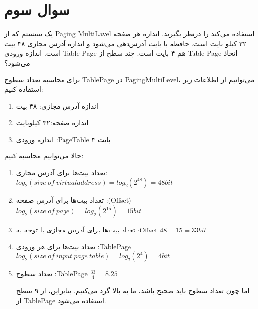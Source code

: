 \section{سوال سوم}
یک سیستم که از Paging MultiLavel استفاده می‌کند را درنظر بگیرید. اندازه هر صفحه ۳۲ کبلو بایت است. حافظه با بایت آدرس‌دهی می‌شود و اندازه آدرس مجازی ۴۸ بیت است. اندازه ورودی Table Page هم ۴ بایت است. چند سطح از Table Page اتخاذ می‌شود؟ 

\begin{qsolve}
	
	برای محاسبه تعداد سطوح TablePage در PagingMultiLevel، می‌توانیم از اطلاعات زیر استفاده کنیم:
	
	\begin{enumerate}
		\item اندازه آدرس مجازی: ۴۸ بیت
		\item اندازه صفحه:‌۳۲ کیلوبایت
		\item اندازه ورودی :PageTable ۴ بایت
	\end{enumerate}
	
	حالا می‌توانیم محاسبه کنیم:
	
	\begin{enumerate}
		\item تعداد بیت‌ها برای آدرس مجازی:
		$log_2(size \ of \ virtual address) = log_2(2^{48}) = 48 bit$
		
		\item تعداد بیت‌ها برای آدرس صفحه :(Offset)
		$log_2(size \ of \ page) = log_2(2^{15}) = 15 bit$
		
		\item تعداد بیت‌ها برای آدرس مجازی با توجه به :Offset
		$48 - 15 = 33 bit$
		
		\item تعداد بیت‌ها برای هر ورودی :TablePage
		$log_2(size \ of \ input \ page \ table) = log_2(2^4) = 4 bit$
		
		\item تعداد سطوح :TablePage
		$\frac{33}{4} = 8.25$
		
اما چون تعداد سطوح باید صحیح باشد، ما به بالا گرد می‌کنیم. بنابراین، از ۹ سطح از TablePage استفاده می‌شود.
	\end{enumerate}
	
\end{qsolve}